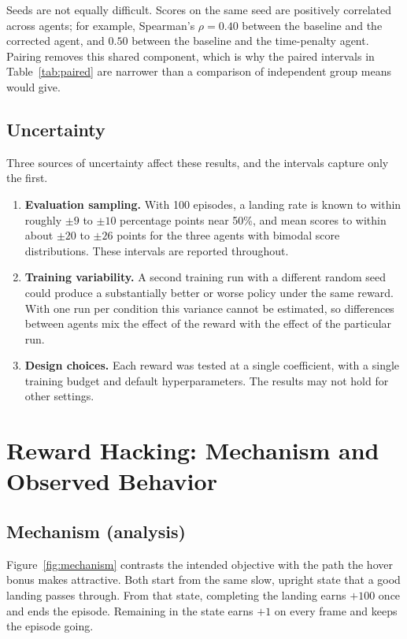 \documentclass[11pt,a4paper]{article}
\begin{document}
Seeds are not equally difficult. Scores on the same seed are positively correlated across agents; for example, Spearman's $\rho=0.40$ between the baseline and the corrected agent, and $0.50$ between the baseline and the time-penalty agent. Pairing removes this shared component, which is why the paired intervals in Table~\ref{tab:paired} are narrower than a comparison of independent group means would give.

\subsection{Uncertainty}

Three sources of uncertainty affect these results, and the intervals capture only the first.
\begin{enumerate}
  \item \textbf{Evaluation sampling.} With 100 episodes, a landing rate is known to within roughly $\pm9$ to $\pm10$ percentage points near 50\%, and mean scores to within about $\pm20$ to $\pm26$ points for the three agents with bimodal score distributions. These intervals are reported throughout.
  \item \textbf{Training variability.} A second training run with a different random seed could produce a substantially better or worse policy under the same reward. With one run per condition this variance cannot be estimated, so differences between agents mix the effect of the reward with the effect of the particular run.
  \item \textbf{Design choices.} Each reward was tested at a single coefficient, with a single training budget and default hyperparameters. The results may not hold for other settings.
\end{enumerate}

\section{Reward Hacking: Mechanism and Observed Behavior}\label{sec:hacking}

\subsection{Mechanism (analysis)}

Figure~\ref{fig:mechanism} contrasts the intended objective with the path the hover bonus makes attractive. Both start from the same slow, upright state that a good landing passes through. From that state, completing the landing earns $+100$ once and ends the episode. Remaining in the state earns $+1$ on every frame and keeps the episode going.
\end{document}
